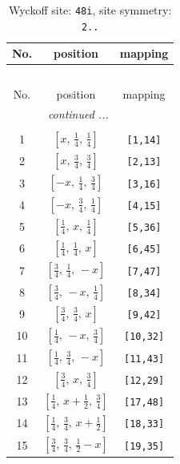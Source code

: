 \documentclass[fleqn,8pt]{jsarticle}
\begin{document}
\begin{longtable}{ccc}
\caption{Wyckoff site: {\tt 48i}, site symmetry: {\tt 2..}}
 \\
 \hline \hline
No. & position & mapping \\ \hline \endfirsthead

\multicolumn{2}{l}{\tablename\ \thetable{}} \\
 \hline \hline
No. & position & mapping \\ \hline \endhead

 \hline \hline
\multicolumn{2}{r}{\footnotesize\it continued ...} \\ \endfoot

 \hline \hline
\multicolumn{2}{r}{} \\ \endlastfoot

1 & $\left[ x,\, \frac{1}{4},\, \frac{1}{4} \right]$ & {\tt [1,14]} \\ \hline
2 & $\left[ x,\, \frac{3}{4},\, \frac{3}{4} \right]$ & {\tt [2,13]} \\ \hline
3 & $\left[ - x,\, \frac{1}{4},\, \frac{3}{4} \right]$ & {\tt [3,16]} \\ \hline
4 & $\left[ - x,\, \frac{3}{4},\, \frac{1}{4} \right]$ & {\tt [4,15]} \\ \hline
5 & $\left[ \frac{1}{4},\, x,\, \frac{1}{4} \right]$ & {\tt [5,36]} \\ \hline
6 & $\left[ \frac{1}{4},\, \frac{1}{4},\, x \right]$ & {\tt [6,45]} \\ \hline
7 & $\left[ \frac{3}{4},\, \frac{1}{4},\, - x \right]$ & {\tt [7,47]} \\ \hline
8 & $\left[ \frac{3}{4},\, - x,\, \frac{1}{4} \right]$ & {\tt [8,34]} \\ \hline
9 & $\left[ \frac{3}{4},\, \frac{3}{4},\, x \right]$ & {\tt [9,42]} \\ \hline
10 & $\left[ \frac{1}{4},\, - x,\, \frac{3}{4} \right]$ & {\tt [10,32]} \\ \hline
11 & $\left[ \frac{1}{4},\, \frac{3}{4},\, - x \right]$ & {\tt [11,43]} \\ \hline
12 & $\left[ \frac{3}{4},\, x,\, \frac{3}{4} \right]$ & {\tt [12,29]} \\ \hline
13 & $\left[ \frac{1}{4},\, x + \frac{1}{2},\, \frac{3}{4} \right]$ & {\tt [17,48]} \\ \hline
14 & $\left[ \frac{1}{4},\, \frac{3}{4},\, x + \frac{1}{2} \right]$ & {\tt [18,33]} \\ \hline
15 & $\left[ \frac{3}{4},\, \frac{3}{4},\, \frac{1}{2} - x \right]$ & {\tt [19,35]} \\ \hline

\end{longtable}
\end{document}
